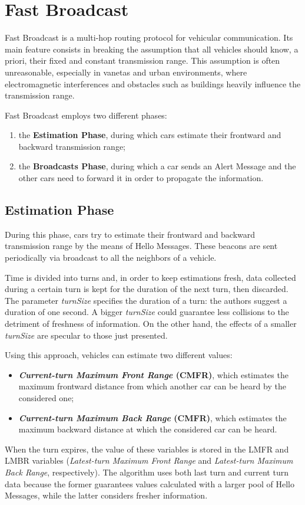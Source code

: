 
\chapter{Fast Broadcast}
	Fast Broadcast \cite{4199282} is a multi-hop routing protocol for vehicular communication. Its main feature consists in breaking the assumption that all vehicles should know, a priori, their fixed and constant transmission range. This assumption is often unreasonable, especially in \acrshort{vaneta}s and urban environments, where electromagnetic interferences and obstacles such as buildings heavily influence the transmission range.
	
	
	Fast Broadcast employs two different phases:
	\begin{enumerate}
		\item the \textbf{Estimation Phase}, during which cars estimate their frontward and backward transmission range;
		\item the \textbf{Broadcasts Phase}, during which a car sends an Alert Message and the other cars need to forward it in order to propagate the information.
	\end{enumerate}

	\section{Estimation Phase}
		During this phase, cars try to estimate their frontward and backward transmission range by the means of Hello Messages. These beacons are sent periodically via broadcast to all the neighbors of a vehicle.
		
		
		Time is divided into turns and, in order to keep estimations fresh, data collected during a certain turn is kept for the duration of the next turn, then discarded. The parameter \textit{turnSize} specifies the duration of a turn: the authors suggest a duration of one second. A bigger \textit{turnSize} could guarantee less collisions to the detriment of freshness of information. On the other hand, the effects of a smaller \textit{turnSize} are specular to those just presented. 
		
		
		Using this approach, vehicles can estimate two different values:
		\begin{itemize}
			\item \textbf{\textit{Current-turn Maximum Front Range} (CMFR)}, which estimates the maximum frontward distance from which another car can be heard by the considered one;
			\item \textbf{\textit{Current-turn Maximum Back Range} (CMFR)}, which estimates the maximum backward distance at which the considered car can be heard.
		\end{itemize}
		When the turn expires, the value of these variables is stored in the LMFR and LMBR variables (\textit{Latest-turn Maximum Front Range} and \textit{Latest-turn Maximum Back Range}, respectively). The algorithm uses both last turn and current turn data because the former guarantees values calculated with a larger pool of Hello Messages, while the latter considers fresher information.
		
